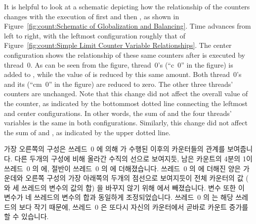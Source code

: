 \begin{lineref}
It is helpful to look at a schematic depicting how the relationship
of the counters changes with the execution of first
 and then , as shown in
Figure~\ref{fig:count:Schematic of Globalization and Balancing}.
Time advances from left to right, with the leftmost configuration
roughly that of
Figure~\ref{fig:count:Simple Limit Counter Variable Relationships}.
The center configuration shows the relationship of these same counters
after  is executed by thread~0.
As can be seen from the figure, thread~0's  (``c~0'' in
the figure) is added to , while the value of
 is reduced by this same amount.
Both thread~0's  and its 
(``cm~0'' in the figure) are reduced to zero.
The other three threads' counters are unchanged.
Note that this change did not affect the overall value of the counter,
as indicated by the bottommost dotted line connecting the leftmost
and center configurations.
In other words, the sum of  and the four threads'
 variables is the same in both configurations.
Similarly, this change did not affect the sum of  and
, as indicated by the upper dotted line.
\fi

가장 오른쪽의 구성은 쓰레드~0 에 의해  가 수행된 이후의
카운터들의 관계를 보여줍니다.
다른 두개의 구성에 비해 올라간 수직의 선으로 보여지듯, 남은 카운트의 4분의 1이
쓰레드~0 의  에, 절반이 쓰레드~0 의  에
더해졌습니다.
쓰레드~0 의  에 더해진 양은 가운데와 오른쪽 구성의 가장 아래쪽의
두개의 점선으로 보여지듯이 전체 카운터의 값 ( 와 세 쓰레드의
 변수의 값의 합) 을 바꾸지 않기 위해  에서
빼졌습니다.
 변수 또한 이 변수가 네 쓰레드의  변수의 합과
동일하게 조정되었습니다.
쓰레드~0 의  는 해당 쓰레드의  보다 작기 때문에,
쓰레드~0 은 또다시 자신의 카운터에서 곧바로 카운트 증가를 할 수 있습니다.

\end{lineref}
